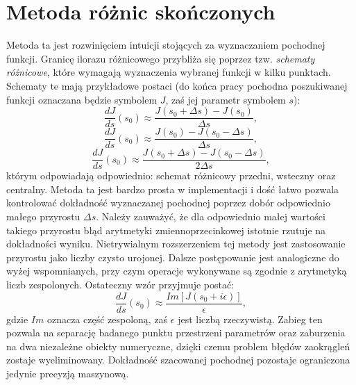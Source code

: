 \documentclass[12pt, twoside]{book}
\begin{document}
\section{Metoda różnic skończonych}
Metoda ta jest rozwinięciem intuicji stojących za wyznaczaniem pochodnej funkcji. Granicę ilorazu różnicowego przybliża się poprzez tzw. \textit{schematy różnicowe}, które wymagają wyznaczenia wybranej funkcji w kilku punktach. Schematy te mają przykładowe postaci (do końca pracy pochodna poszukiwanej funkcji oznaczana będzie symbolem $ J $, zaś jej parametr symbolem $ s $):
\begin{equation}
\frac{dJ}{ds}(s_{0}) \approx \frac{J(s_{0}+\Delta s) - J(s_{0})}{\Delta s},
\end{equation} 
\begin{equation}
\frac{dJ}{ds}(s_{0}) \approx \frac{J(s_{0}) - J(s_{0}-\Delta s)}{\Delta s},
\end{equation} 
\begin{equation}
\frac{dJ}{ds}(s_{0}) \approx \frac{J(s_{0}+\Delta s) - J(s_{0}-\Delta s)}{2\Delta s},
\end{equation}
którym odpowiadają odpowiednio: schemat różnicowy przedni, wsteczny oraz centralny. \newline
Metoda ta jest bardzo prosta w implementacji i dość łatwo pozwala kontrolować dokładność wyznaczanej pochodnej poprzez dobór odpowiednio małego przyrostu $ \Delta s  $. Należy zauważyć, że dla odpowiednio małej wartości takiego przyrostu błąd arytmetyki zmiennoprzecinkowej istotnie rzutuje na dokładności wyniku. Nietrywialnym rozszerzeniem tej metody jest zastosowanie przyrostu jako liczby czysto urojonej. Dalsze postępowanie jest analogiczne do wyżej wspomnianych, przy czym operacje wykonywane są zgodnie z arytmetyką liczb zespolonych. Ostateczny wzór przyjmuje postać:
\begin{equation}
\frac{dJ}{ds}(s_{0}) \approx \frac{Im[J(s_{0}+i\epsilon)]}{\epsilon},
\end{equation}
gdzie $ Im $ oznacza część zespoloną, zaś $\epsilon$ jest liczbą rzeczywistą. Zabieg ten pozwala na separację badanego punktu przestrzeni parametrów oraz zaburzenia na dwa niezależne obiekty numeryczne, dzięki czemu problem błędów zaokrągleń zostaje wyeliminowany. Dokładność szacowanej pochodnej pozostaje ograniczona jedynie precyzją maszynową.
\end{document}
